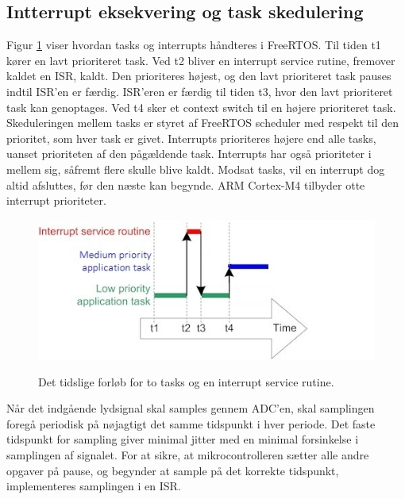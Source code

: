 \subsection{Intterrupt eksekvering og task skedulering}
Figur \ref{fig:int_task} viser hvordan tasks og interrupts håndteres i FreeRTOS. 
Til tiden t1 kører en lavt prioriteret task. 
Ved t2 bliver en interrupt service rutine, fremover kaldet en ISR, kaldt. 
Den prioriteres højest, og den lavt prioriteret task pauses indtil ISR'en er færdig.
ISR'eren er færdig til tiden t3, hvor den lavt prioriteret task kan genoptages.
Ved t4 sker et context switch til en højere prioriteret task.
Skeduleringen mellem tasks er styret af FreeRTOS scheduler med respekt til den prioritet, som hver task er givet. 
Interrupts prioriteres højere end alle tasks, uanset prioriteten af den pågældende task. 
Interrupts har også prioriteter i mellem sig, såfremt flere skulle blive kaldt. 
Modsat tasks, vil en interrupt dog altid afsluttes, før den næste kan begynde. 
ARM Cortex-M4 tilbyder otte interrupt prioriteter. 
\begin{figure}[h]
	\caption{Det tidslige forløb for to tasks og en interrupt service rutine. }
	\centering
	\includegraphics[width=0.7\linewidth]{billeder/interruptandtaskprocessing.jpg}
	\label{fig:int_task}
\end{figure}

Når det indgående lydsignal skal samples gennem ADC'en, skal samplingen foregå periodisk på nøjagtigt det samme tidspunkt i hver periode.
Det faste tidspunkt for sampling giver minimal jitter med en minimal forsinkelse i samplingen af signalet. 
For at sikre, at mikrocontrolleren sætter alle andre opgaver på pause, og begynder at sample på det korrekte tidspunkt, implementeres samplingen i en ISR.

